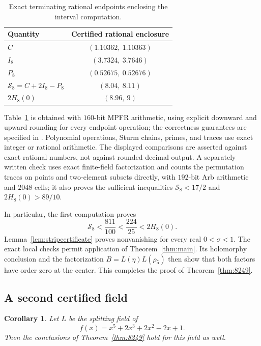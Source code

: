\documentclass[11pt]{article}
\newtheorem{corollary}[theorem]{Corollary}
\theoremstyle{definition}
\theoremstyle{remark}
\newcommand{\rh}{\rho_5}
\numberwithin{equation}{section}
\begin{document}
\begin{table}[ht]
\centering
\begin{tabular}{@{}lc@{}}
\toprule
Quantity&Certified rational enclosure\\
\midrule
$C$&$(1.10362,\ 1.10363)$\\
$I_8$&$(3.7324,\ 3.7646)$\\
$P_8$&$(0.52675,\ 0.52676)$\\
$\mathcal S_8=C+2I_8-P_8$&$(8.04,\ 8.11)$\\
$2H_8(0)$&$(8.96,\ 9)$\\
\bottomrule
\end{tabular}
\caption{Exact terminating rational endpoints enclosing the interval computation.}
\label{tab:certificate8249}
\end{table}

Table~\ref{tab:certificate8249} is obtained with $160$-bit MPFR arithmetic, using explicit downward and upward rounding for every endpoint operation; the correctness guarantees are specified in \citet[Sections 4.4 and 5.7]{mpfr}. Polynomial operations, Sturm chains, primes, and traces use exact integer or rational arithmetic. The displayed comparisons are asserted against exact rational numbers, not against rounded decimal output. A separately written check uses exact finite-field factorization and counts the permutation traces on points and two-element subsets directly, with $192$-bit Arb arithmetic and $2048$ cells; it also proves the sufficient inequalities $\mathcal S_8<17/2$ and $2H_8(0)>89/10$.

In particular, the first computation proves
\[
\mathcal S_8<\frac{811}{100}<\frac{224}{25}<2H_8(0).
\]
Lemma~\ref{lem:stripcertificate} proves nonvanishing for every real $0<\sigma<1$. The exact local checks permit application of Theorem~\ref{thm:main}. Its holomorphy conclusion and the factorization $B=L(\eta)L(\rh)$ then show that both factors have order zero at the center. This completes the proof of Theorem~\ref{thm:8249}.

\subsection{A second certified field}

\begin{corollary}\label{cor:60061}
Let $L$ be the splitting field of
\[
f(x)=x^5+2x^3+2x^2-2x+1.
\]
Then the conclusions of Theorem~\ref{thm:8249} hold for this field as well.
\end{corollary}
\end{document}
